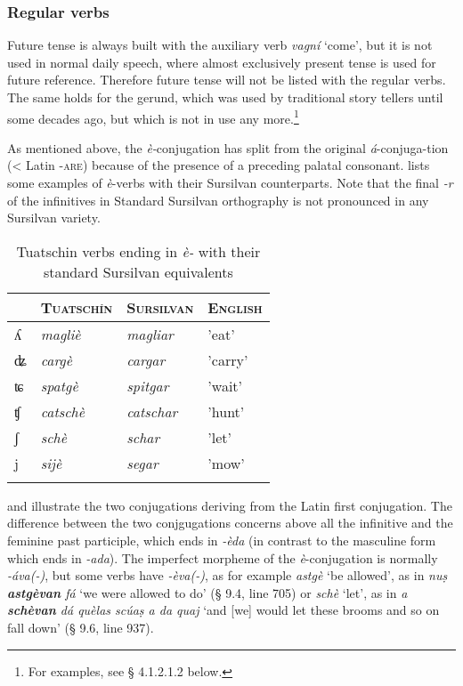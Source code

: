\subsubsection{Regular verbs}
Future tense is always built with the auxiliary verb \textit{vagní} `come', but it is not used in normal daily speech, where almost exclusively present tense is used for future reference. Therefore future tense will not be listed with the regular verbs. The same holds for the gerund, which was used by traditional story tellers until some decades ago, but which is not in use any more.\footnote{For examples, see § 4.1.2.1.2 below.}

As mentioned above, the \textit{è-}conjugation has split from the original \textit{á}-conjuga-tion (< Latin \textsc{-are})  because of the presence of a preceding palatal consonant.  lists some examples of \textit{è}-verbs with their Sursilvan counterparts. Note that the final \textit{-r} of the infinitives in Standard Sursilvan orthography is not pronounced in any Sursilvan variety.

\begin{table}
\caption{Tuatschin verbs ending in \textit{è-} with their standard Sursilvan equivalents}
\label{tab:èconj}
 \begin{tabular}{llll}
 \lsptoprule
&\textsc{Tuatschín}  & \textsc{Sursilvan}  & \textsc{English} \\
  \midrule
 ʎ & \textit{magliè} &\textit{magliar}& 'eat' \\
ʥ&\textit{cargè}&\textit{cargar}&'carry'\\
ʨ&\textit{spatgè}&\textit{spitgar}&'wait'\\
ʧ&\textit{catschè}&\textit{catschar}&'hunt'\\
ʃ&\textit{schè}&\textit{schar}&'let'\\
j&\textit{sijè}&\textit{segar}&'mow'\\   
 \lspbottomrule
 \end{tabular}
\end{table}

 and  illustrate the two conjugations deriving from the Latin first conjugation. The difference between the two conjgugations concerns above all the infinitive and the feminine past participle, which ends in  \textit{-èda} (in contrast to the masculine form which ends in \textit{-ada}). The imperfect morpheme of the \textit{è}-conjugation is normally \textit{-áva(-)}, but some verbs have \textit{-èva(-)}, as for example \textit{astgè} `be allowed', as in \textit{nuṣ \textbf{astgèvan} fá} `we were allowed to do' (§ 9.4, line 705) or \textit{schè} `let', as in \textit{a \textbf{schèvan} dá quèlas scúaṣ a da quaj} `and [we] would let these brooms and so on fall down' (§ 9.6, line 937).



